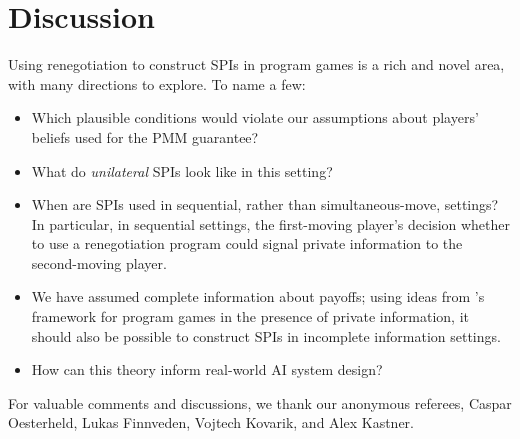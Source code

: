 \documentclass[sigconf]{aamas}
\theoremstyle{definition}
\begin{document}
\section{Discussion}
\label{sec:disc}
Using renegotiation to construct 
SPIs in program games
is a rich and novel
area, 
with many directions to explore. 
To name a few:
\begin{itemize}
    \item Which plausible conditions would violate our assumptions about
    players' beliefs used for the PMM guarantee?
    \item What do \textit{unilateral} 
    SPIs \citep{oesterheld2021safe} look like in this setting?
    \item When are 
    SPIs used in sequential, rather than 
    simultaneous-move, settings? 
    In particular, in sequential settings, 
    the first-moving player's decision whether to use a renegotiation program 
    could
    signal private information to the second-moving player.
    \item We have assumed complete information about payoffs;
    using ideas from \citet{DiGiovanni2022Apr}'s framework 
    for program games in the presence of private information, it should 
    also 
    be possible to construct SPIs in incomplete information settings.
    \item How can 
    this theory inform real-world AI system design?
\end{itemize}

\begin{acks}
    For valuable comments and discussions, we thank our anonymous referees, Caspar Oesterheld, Lukas Finnveden, Vojtech Kovarik, and Alex Kastner.
\end{acks}

\balance



\newpage
\onecolumn

\appendix


\end{document}
